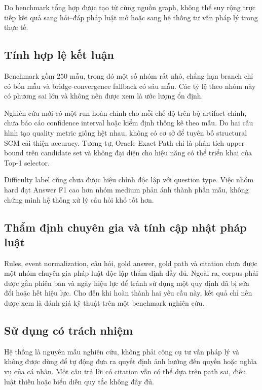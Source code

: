Do benchmark tổng hợp được tạo từ cùng nguồn graph, không thể suy rộng trực
tiếp kết quả sang hỏi--đáp pháp luật mở hoặc sang hệ thống tư vấn pháp lý
trong thực tế.

\subsection{Tính hợp lệ kết luận}

Benchmark gồm $250$ mẫu, trong đó một số nhóm rất nhỏ, chẳng hạn branch chỉ
có bốn mẫu và bridge-convergence fallback có sáu mẫu. Các tỷ lệ theo nhóm
này có phương sai lớn và không nên được xem là ước lượng ổn định.

Nghiên cứu mới có một run hoàn chỉnh cho mỗi chế độ trên bộ artifact chính,
chưa báo cáo confidence interval hoặc kiểm định thống kê theo mẫu. Do hai
cấu hình tạo quality metric giống hệt nhau, không có cơ sở để tuyên bố
structural SCM cải thiện accuracy. Tương tự, Oracle Exact Path chỉ là phân
tích upper bound trên candidate set và không đại diện cho hiệu năng có thể
triển khai của Top-1 selector.

Difficulty label cũng chưa được hiệu chỉnh độc lập với question type. Việc
nhóm hard đạt Answer F1 cao hơn nhóm medium phản ánh thành phần mẫu, không
chứng minh hệ thống xử lý câu hỏi khó tốt hơn.

\subsection{Thẩm định chuyên gia và tính cập nhật pháp luật}

Rules, event normalization, câu hỏi, gold answer, gold path và citation chưa
được một nhóm chuyên gia pháp luật độc lập thẩm định đầy đủ. Ngoài ra, corpus
phải được gắn phiên bản và ngày hiệu lực để tránh sử dụng một quy định đã bị
sửa đổi hoặc hết hiệu lực. Cho đến khi hoàn thành hai yêu cầu này, kết quả
chỉ nên được xem là đánh giá kỹ thuật trên một benchmark nghiên cứu.

\subsection{Sử dụng có trách nhiệm}

Hệ thống là nguyên mẫu nghiên cứu, không phải công cụ tư vấn pháp lý và
không được dùng để tự động đưa ra quyết định ảnh hưởng đến quyền hoặc nghĩa
vụ của cá nhân. Một câu trả lời có citation vẫn có thể dựa trên path sai,
điều luật thiếu hoặc biểu diễn quy tắc không đầy đủ.

